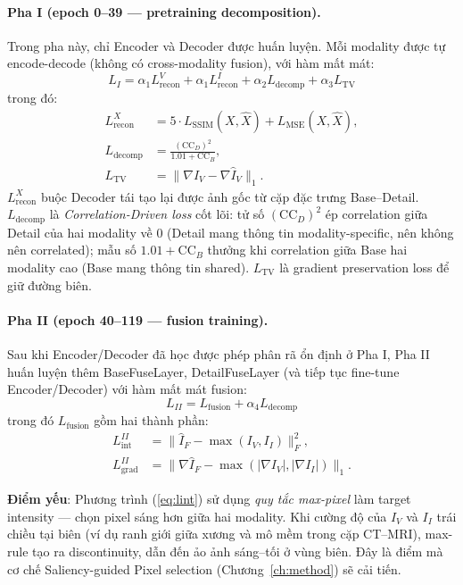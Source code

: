 \paragraph{Pha I (epoch 0--39 --- pretraining decomposition).}
Trong pha này, chỉ Encoder và Decoder được huấn luyện. Mỗi modality được tự encode-decode (không có cross-modality fusion), với hàm mất mát:
\begin{equation}
L_I = \alpha_1 L_{\mathrm{recon}}^{V} + \alpha_1 L_{\mathrm{recon}}^{I} + \alpha_2 L_{\mathrm{decomp}} + \alpha_3 L_{\mathrm{TV}}
\end{equation}
trong đó:
\begin{align}
L_{\mathrm{recon}}^{X} &= 5\cdot L_{\mathrm{SSIM}}(X, \hat{X}) + L_{\mathrm{MSE}}(X, \hat{X}), \\
L_{\mathrm{decomp}}    &= \frac{(\mathrm{CC}_D)^2}{1.01 + \mathrm{CC}_B}, \\
L_{\mathrm{TV}}        &= \|\nabla I_V - \nabla \hat{I}_V\|_1.
\end{align}
$L_{\mathrm{recon}}^{X}$ buộc Decoder tái tạo lại được ảnh gốc từ cặp đặc trưng Base--Detail. $L_{\mathrm{decomp}}$ là \emph{Correlation-Driven loss} cốt lõi: tử số $(\mathrm{CC}_D)^2$ ép correlation giữa Detail của hai modality về $0$ (Detail mang thông tin modality-specific, nên không nên correlated); mẫu số $1.01 + \mathrm{CC}_B$ thưởng khi correlation giữa Base hai modality cao (Base mang thông tin shared). $L_{\mathrm{TV}}$ là gradient preservation loss để giữ đường biên.

\paragraph{Pha II (epoch 40--119 --- fusion training).}
Sau khi Encoder/Decoder đã học được phép phân rã ổn định ở Pha I, Pha II huấn luyện thêm BaseFuseLayer, DetailFuseLayer (và tiếp tục fine-tune Encoder/Decoder) với hàm mất mát fusion:
\begin{equation}
L_{II} = L_{\mathrm{fusion}} + \alpha_4 L_{\mathrm{decomp}}
\end{equation}
trong đó $L_{\mathrm{fusion}}$ gồm hai thành phần:
\begin{align}
L_{\mathrm{int}}^{II}  &= \|\hat{I}_F - \max(I_V, I_I)\|_F^2, \label{eq:lint}\\
L_{\mathrm{grad}}^{II} &= \|\nabla \hat{I}_F - \max(|\nabla I_V|, |\nabla I_I|)\|_1.
\end{align}

\textbf{Điểm yếu}: Phương trình (\ref{eq:lint}) sử dụng \emph{quy tắc max-pixel} làm target intensity --- chọn pixel sáng hơn giữa hai modality. Khi cường độ của $I_V$ và $I_I$ trái chiều tại biên (ví dụ ranh giới giữa xương và mô mềm trong cặp CT--MRI), max-rule tạo ra discontinuity, dẫn đến ảo ảnh sáng--tối ở vùng biên. Đây là điểm mà cơ chế Saliency-guided Pixel selection (Chương~\ref{ch:method}) sẽ cải tiến.

